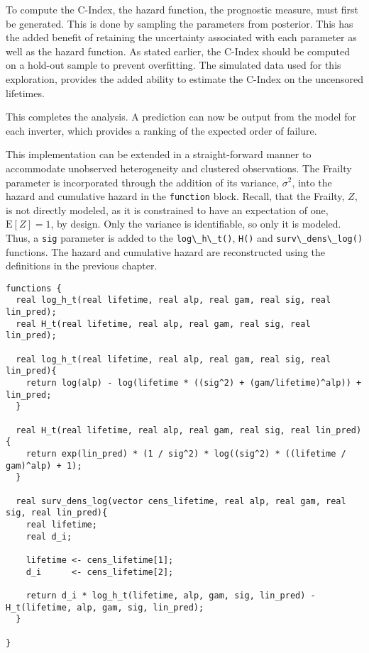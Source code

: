 To compute the C-Index, the hazard function, the prognostic measure, must first be generated. This is done by sampling the parameters from posterior. This has the added benefit of retaining the uncertainty associated with each parameter as well as the hazard function. As stated earlier, the C-Index should be computed on a hold-out sample to prevent overfitting. The simulated data used for this exploration, provides the added ability to estimate the C-Index on the uncensored lifetimes. 

This completes the analysis. A prediction can now be output from the model for each inverter, which provides a ranking of the expected order of failure. 



This implementation can be extended in a straight-forward manner to accommodate unobserved heterogeneity and clustered observations. The Frailty parameter is incorporated through the addition of its variance, $\sigma^2$, into the hazard and cumulative hazard in the \lstinline{function} block. Recall, that the Frailty, $Z$, is not directly modeled, as it is constrained to have an expectation of one, $\mathrm{E}[Z]=1$, by design. Only the variance is identifiable, so only it is modeled. Thus, a \lstinline{sig} parameter is added to the \lstinline{log\_h\_t()}, \lstinline{H()} and \lstinline{surv\_dens\_log()} functions. The hazard and cumulative hazard are reconstructed using the definitions in the previous chapter. 

\begin{lstlisting}
functions {
  real log_h_t(real lifetime, real alp, real gam, real sig, real lin_pred);
  real H_t(real lifetime, real alp, real gam, real sig, real lin_pred);
  
  real log_h_t(real lifetime, real alp, real gam, real sig, real lin_pred){
    return log(alp) - log(lifetime * ((sig^2) + (gam/lifetime)^alp)) + lin_pred;
  }
  
  real H_t(real lifetime, real alp, real gam, real sig, real lin_pred){
    return exp(lin_pred) * (1 / sig^2) * log((sig^2) * ((lifetime / gam)^alp) + 1);
  }
  
  real surv_dens_log(vector cens_lifetime, real alp, real gam, real sig, real lin_pred){
    real lifetime;
    real d_i;
    
    lifetime <- cens_lifetime[1];
    d_i      <- cens_lifetime[2];
  
    return d_i * log_h_t(lifetime, alp, gam, sig, lin_pred) - H_t(lifetime, alp, gam, sig, lin_pred);
  }

}
\end{lstlisting}


